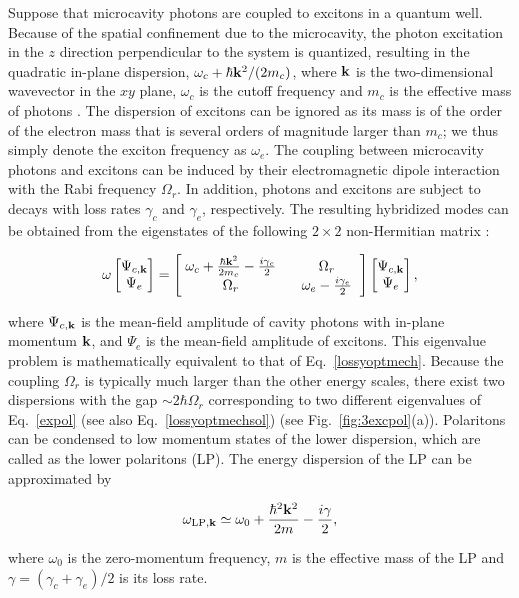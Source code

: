 \documentclass{tADP2e}
\theoremstyle{plain}
\newcommand{\eqn}[1]{
\begin{eqnarray}
	#1
\end{eqnarray}
}
\theoremstyle{plain}
\theoremstyle{definition}
\begin{document}
Suppose that microcavity photons are coupled to excitons in a quantum well.  Because of the spatial confinement due to the microcavity, the photon excitation in the $z$ direction perpendicular to the system is quantized, resulting in the quadratic in-plane dispersion, $\omega_c+\hbar{\bf k}^2/(2m_c)$, where $\bf k$ is  the two-dimensional wavevector in the $xy$ plane, $\omega_c$ is the cutoff frequency and $m_c$ is the effective mass of photons \cite{DH10,CI13}. The dispersion of excitons can be ignored as its mass is of the order of the electron mass that is several orders of magnitude larger than $m_c$; we thus simply denote the exciton frequency as $\omega_e$. The coupling between microcavity photons and excitons can be induced by their electromagnetic dipole interaction with the Rabi frequency $\Omega_r$. In addition, photons and excitons are subject to decays with loss rates $\gamma_c$ and $\gamma_e$, respectively. The resulting hybridized modes can be obtained from the eigenstates of the following $2\times 2$ non-Hermitian matrix \cite{VS95,KG99}:
\eqn{\label{expol}
\omega
\begin{bmatrix}
\Psi_{c,{\bf k}}\\
\Psi_{e}
\end{bmatrix}=
\begin{bmatrix}
\;\omega_{c}+\frac{\hbar {\bf k}^2}{2m_{c}}-\frac{i\gamma_{c}}{2}\; & \;\;\Omega_{r}\;\; \\
\;\Omega_r\; & \;\;\omega_e-\frac{i\gamma_e}{2}\;\;
\end{bmatrix}
\begin{bmatrix}
\Psi_{c,{\bf k}}\\
\Psi_{e}
\end{bmatrix},
}
where $\Psi_{c,{\bf k}}$ is the mean-field amplitude of cavity photons with in-plane momentum $\bf k$, and $\Psi_e$ is the mean-field amplitude of excitons. This eigenvalue problem is mathematically equivalent to that of Eq.~\eqref{lossyoptmech}. Because the coupling $\Omega_r$ is typically much larger than the other energy scales, there exist two  dispersions with the gap $\sim2\hbar\Omega_r$ corresponding to two different eigenvalues of Eq.~\eqref{expol} (see also Eq.~\eqref{lossyoptmechsol}) (see Fig.~\ref{fig:3excpol}(a)). Polaritons  can be condensed to low momentum states of the lower dispersion, which are called as the lower polaritons (LP). The energy dispersion of the LP can be approximated by
\eqn{
\omega_{{\rm LP},{\bf k}}\simeq\omega_{0}+\frac{\hbar^2{\bf k}^2}{2m}-\frac{i\gamma}{2},
}
where $\omega_0$ is the zero-momentum frequency,  $m$ is the effective mass of the LP and $\gamma=(\gamma_c+\gamma_e)/2$ is its loss rate. 
\end{document}
